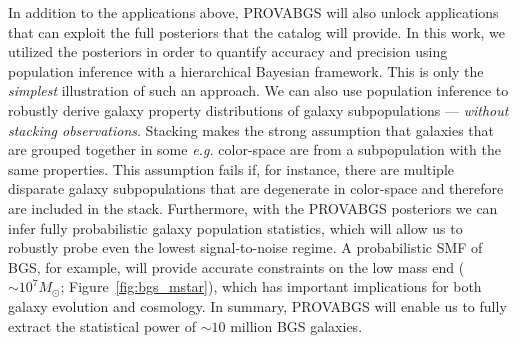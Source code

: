 In addition to the applications above, {\sc PROVABGS} will also unlock
applications that can exploit the full posteriors that the catalog will
provide. 
In this work, we utilized the posteriors in order to quantify accuracy and
precision using population inference with a hierarchical Bayesian framework. 
This is only the \emph{simplest} illustration of such an approach. 
We can also use population inference to robustly derive galaxy property
distributions of galaxy subpopulations --- \emph{without stacking observations}.  
Stacking makes the strong assumption that galaxies that are grouped together in
some \emph{e.g.} color-space are from a subpopulation with the same properties. 
This assumption fails if, for instance, there are multiple disparate galaxy
subpopulations that are degenerate in color-space and therefore are included in
the stack. 
Furthermore, with the {\sc PROVABGS} posteriors we can infer fully
probabilistic galaxy population statistics, which will allow us to robustly
probe even the lowest signal-to-noise regime.
A probabilistic SMF of BGS, for example, will provide accurate constraints on
the low mass end (${\sim}10^{7} M_\odot$; Figure~\ref{fig:bgs_mstar}), which
has important implications for both galaxy evolution and cosmology. 
In summary, {\sc PROVABGS} will enable us to fully extract the statistical
power of ${\sim 10}$ million BGS galaxies.
